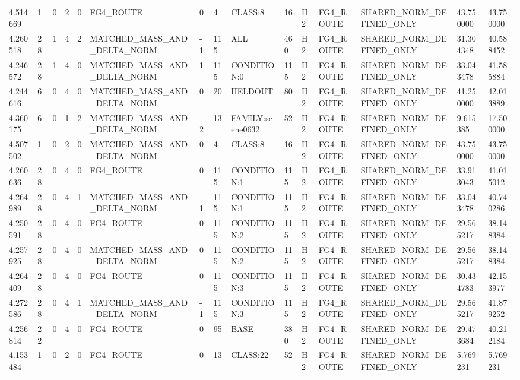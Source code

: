 \begin{tabular}{lllllllllllllll}
4.514669 & 1 & 0 & 2 & 0 & FG4\_ROUTE & 0 & 4 & CLASS:8 & 16 & H2 & FG4\_ROUTE & SHARED\_NORM\_DEFINED\_ONLY & 43.750000 & 43.750000 \\
4.260518 & 28 & 1 & 4 & 2 & MATCHED\_MASS\_AND\_DELTA\_NORM & -1 & 115 & ALL & 460 & H2 & FG4\_ROUTE & SHARED\_NORM\_DEFINED\_ONLY & 31.304348 & 40.588452 \\
4.246572 & 28 & 1 & 4 & 0 & MATCHED\_MASS\_AND\_DELTA\_NORM & 1 & 115 & CONDITION:0 & 115 & H2 & FG4\_ROUTE & SHARED\_NORM\_DEFINED\_ONLY & 33.043478 & 41.585884 \\
4.244616 & 6 & 0 & 4 & 0 & MATCHED\_MASS\_AND\_DELTA\_NORM & 0 & 20 & HELDOUT & 80 & H2 & FG4\_ROUTE & SHARED\_NORM\_DEFINED\_ONLY & 41.250000 & 42.013889 \\
4.360175 & 6 & 0 & 1 & 2 & MATCHED\_MASS\_AND\_DELTA\_NORM & -2 & 13 & FAMILY:scene0632 & 52 & H2 & FG4\_ROUTE & SHARED\_NORM\_DEFINED\_ONLY & 9.615385 & 17.500000 \\
4.507502 & 1 & 0 & 2 & 0 & MATCHED\_MASS\_AND\_DELTA\_NORM & 0 & 4 & CLASS:8 & 16 & H2 & FG4\_ROUTE & SHARED\_NORM\_DEFINED\_ONLY & 43.750000 & 43.750000 \\
4.260636 & 28 & 0 & 4 & 0 & FG4\_ROUTE & 0 & 115 & CONDITION:1 & 115 & H2 & FG4\_ROUTE & SHARED\_NORM\_DEFINED\_ONLY & 33.913043 & 41.015012 \\
4.264989 & 28 & 0 & 4 & 1 & MATCHED\_MASS\_AND\_DELTA\_NORM & -1 & 115 & CONDITION:1 & 115 & H2 & FG4\_ROUTE & SHARED\_NORM\_DEFINED\_ONLY & 33.043478 & 40.740286 \\
4.250591 & 28 & 0 & 4 & 0 & FG4\_ROUTE & 0 & 115 & CONDITION:2 & 115 & H2 & FG4\_ROUTE & SHARED\_NORM\_DEFINED\_ONLY & 29.565217 & 38.148384 \\
4.257925 & 28 & 0 & 4 & 0 & MATCHED\_MASS\_AND\_DELTA\_NORM & 0 & 115 & CONDITION:2 & 115 & H2 & FG4\_ROUTE & SHARED\_NORM\_DEFINED\_ONLY & 29.565217 & 38.148384 \\
4.264409 & 28 & 0 & 4 & 0 & FG4\_ROUTE & 0 & 115 & CONDITION:3 & 115 & H2 & FG4\_ROUTE & SHARED\_NORM\_DEFINED\_ONLY & 30.434783 & 42.153977 \\
4.272586 & 28 & 0 & 4 & 1 & MATCHED\_MASS\_AND\_DELTA\_NORM & -1 & 115 & CONDITION:3 & 115 & H2 & FG4\_ROUTE & SHARED\_NORM\_DEFINED\_ONLY & 29.565217 & 41.879252 \\
4.256814 & 22 & 0 & 4 & 0 & FG4\_ROUTE & 0 & 95 & BASE & 380 & H2 & FG4\_ROUTE & SHARED\_NORM\_DEFINED\_ONLY & 29.473684 & 40.212184 \\
4.153484 & 1 & 0 & 2 & 0 & FG4\_ROUTE & 0 & 13 & CLASS:22 & 52 & H2 & FG4\_ROUTE & SHARED\_NORM\_DEFINED\_ONLY & 5.769231 & 5.769231 \\

\end{tabular}
